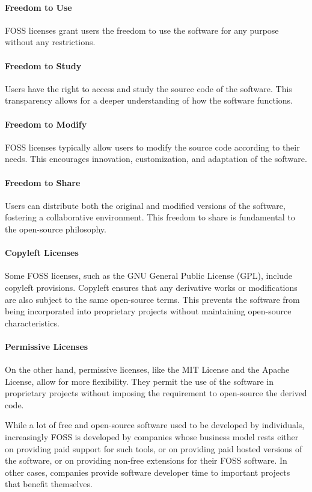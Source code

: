 \paragraph*{Freedom to Use} FOSS licenses grant users the freedom to use the software for any purpose without any restrictions.

\paragraph*{Freedom to Study} Users have the right to access and study the source code of the software. This transparency allows for a deeper understanding of how the software functions.

\paragraph*{Freedom to Modify} FOSS licenses typically allow users to modify the source code according to their needs. This encourages innovation, customization, and adaptation of the software.

\paragraph*{Freedom to Share} Users can distribute both the original and modified versions of the software, fostering a collaborative environment. This freedom to share is fundamental to the open-source philosophy.

\paragraph*{Copyleft Licenses} Some FOSS licenses, such as the GNU General Public License (GPL), include copyleft provisions. Copyleft ensures that any derivative works or modifications are also subject to the same open-source terms. This prevents the software from being incorporated into proprietary projects without maintaining open-source characteristics.

\paragraph*{Permissive Licenses} On the other hand, permissive licenses, like the MIT License and the Apache License, allow for more flexibility. They permit the use of the software in proprietary projects without imposing the requirement to open-source the derived code.

While a lot of free and open-source software used to be developed by individuals, increasingly FOSS is developed by companies whose business model rests either on providing paid support for such tools, or on providing paid hosted versions of the software, or on providing non-free extensions for their FOSS software. In other cases, companies provide software developer time to important projects that benefit themselves.

